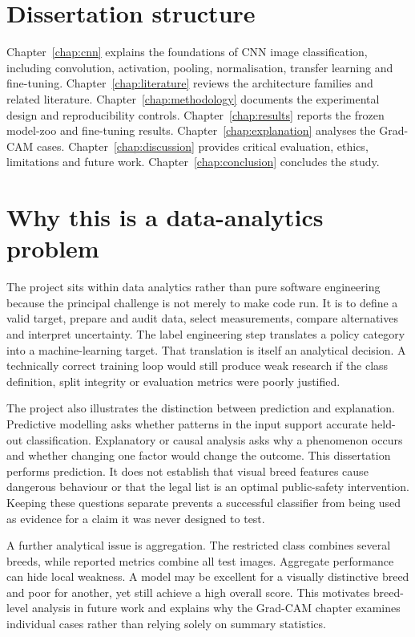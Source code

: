 \section{Dissertation structure}
Chapter~\ref{chap:cnn} explains the foundations of CNN image classification, including convolution, activation, pooling, normalisation, transfer learning and fine-tuning. Chapter~\ref{chap:literature} reviews the architecture families and related literature. Chapter~\ref{chap:methodology} documents the experimental design and reproducibility controls. Chapter~\ref{chap:results} reports the frozen model-zoo and fine-tuning results. Chapter~\ref{chap:explanation} analyses the Grad-CAM cases. Chapter~\ref{chap:discussion} provides critical evaluation, ethics, limitations and future work. Chapter~\ref{chap:conclusion} concludes the study.

\section{Why this is a data-analytics problem}
The project sits within data analytics rather than pure software engineering because the principal challenge is not merely to make code run. It is to define a valid target, prepare and audit data, select measurements, compare alternatives and interpret uncertainty. The label engineering step translates a policy category into a machine-learning target. That translation is itself an analytical decision. A technically correct training loop would still produce weak research if the class definition, split integrity or evaluation metrics were poorly justified.

The project also illustrates the distinction between prediction and explanation. Predictive modelling asks whether patterns in the input support accurate held-out classification. Explanatory or causal analysis asks why a phenomenon occurs and whether changing one factor would change the outcome. This dissertation performs prediction. It does not establish that visual breed features cause dangerous behaviour or that the legal list is an optimal public-safety intervention. Keeping these questions separate prevents a successful classifier from being used as evidence for a claim it was never designed to test.

A further analytical issue is aggregation. The restricted class combines several breeds, while reported metrics combine all test images. Aggregate performance can hide local weakness. A model may be excellent for a visually distinctive breed and poor for another, yet still achieve a high overall score. This motivates breed-level analysis in future work and explains why the Grad-CAM chapter examines individual cases rather than relying solely on summary statistics.

